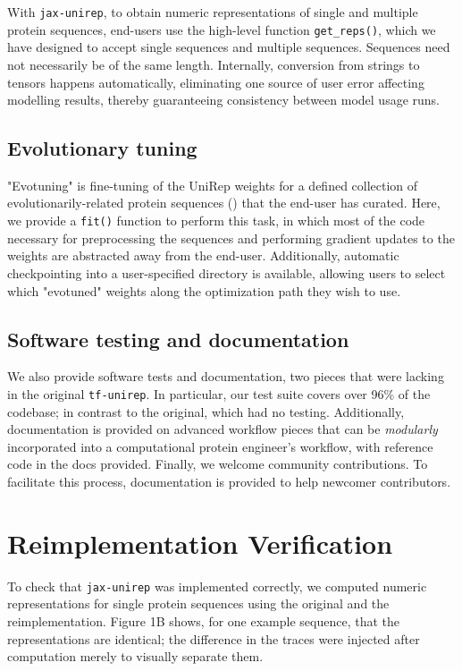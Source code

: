 \documentclass[twoside,11pt]{article}
\begin{document}
With \verb|jax-unirep|,
to obtain numeric representations of single and multiple protein sequences,
end-users use the high-level function \verb|get_reps()|,
which we have designed to accept single sequences and multiple sequences.
Sequences need not necessarily be of the same length.
Internally, conversion from strings to tensors happens automatically,
eliminating one source of user error affecting modelling results,
thereby guaranteeing consistency between model usage runs.

\subsection{Evolutionary tuning}

"Evotuning" is fine-tuning of the UniRep weights
for a defined collection
of evolutionarily-related protein sequences (\cite{alley2019unified})
that the end-user has curated.
Here, we provide a \verb|fit()| function to perform this task,
in which most of the code necessary for preprocessing the sequences
and performing gradient updates to the weights
are abstracted away from the end-user.
Additionally, automatic checkpointing
into a user-specified directory is available,
allowing users to select
which "evotuned" weights along the optimization path
they wish to use.

\subsection{Software testing and documentation}

We also provide software tests and documentation,
two pieces that were lacking in the original \verb|tf-unirep|.
In particular, our test suite covers over 96\% of the codebase;
in contrast to the original, which had no testing.
Additionally, documentation is provided on advanced workflow pieces
that can be \textit{modularly} incorporated
into a computational protein engineer's workflow,
with reference code in the docs provided.
Finally, we welcome community contributions.
To facilitate this process,
documentation is provided to help newcomer contributors.

\section{Reimplementation Verification}

To check that \verb|jax-unirep| was implemented correctly,
we computed numeric representations for single protein sequences
using the original and the reimplementation.
Figure 1B\vphantom{\ref{fig:01}} shows, for one example sequence,
that the representations are identical;
the difference in the traces were injected after computation
merely to visually separate them.
\end{document}
